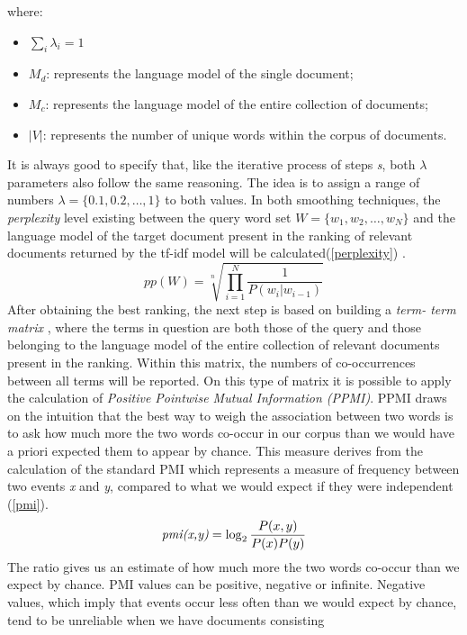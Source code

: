 where:
\begin{itemize}
    \item $\sum_i \lambda_i = 1$
    \item $M_d$: represents the language model of the single document;
    \item $M_c$: represents the language model of the entire collection of documents;
    \item $|V|$: represents the number of unique words within the corpus of documents.
\end{itemize}
It is always good to specify that, like the iterative process of steps \emph{s}, both $\lambda$ 
parameters also follow the same reasoning. The idea is to assign a range of 
numbers $\lambda = \{0.1, 0.2,\ldots,1\}$ to both values. In both smoothing techniques, 
the \emph{perplexity} level existing between the query word set $W = \{w_1, w_2,\ldots,w_N\}$ and the language model of 
the target document present in the ranking of relevant documents returned 
by the tf-idf model will be calculated(\ref{perplexity}) \cite{12}.
\begin{equation}\label{perplexity}
    pp(W) = \sqrt[n]{\prod_{i=1}^N\frac{1}{P(w_i|w_{i-1})}} 
\end{equation}
After obtaining the best ranking, the next step is based on building a \emph{term-
term matrix} \cite{12}, where the terms in question are both those of the query and 
those belonging to the language model of the entire collection of relevant 
documents present in the ranking. Within this matrix, the numbers of co-occurrences 
between all terms will be reported. On this type of matrix it is 
possible to apply the calculation of \emph{Positive Pointwise Mutual Information 
(PPMI)}. PPMI draws on the intuition that the best way to weigh the association 
between two words is to ask how much more the two words co-occur in 
our corpus than we would have a priori expected them to appear by chance. 
This measure derives from the calculation of the standard PMI which represents 
a measure of frequency between two events \emph{x} and \emph{y}, compared to what 
we would expect if they were independent (\ref{pmi}).
\begin{equation}\label{pmi}
    \emph{pmi(x,y)} = \log_2\frac{P(x,y)}{P(x)P(y)}
\end{equation}
The ratio gives us an estimate of how much more the two words co-occur 
than we expect by chance. PMI values can be positive, negative or infinite. 
Negative values, which imply that events occur less often than we would 
expect by chance, tend to be unreliable when we have documents consisting 
